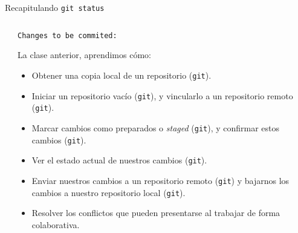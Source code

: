 \begin{frame}[t]{Recapitulando}
    \pause
    \texttt{git status}
    \vspace{.4em}

    \begin{columns}[t]
        \begin{column}{0.05\textwidth}

        \end{column}
        \begin{column}{0.90\textwidth}
            \pause
            \hspace{-.25em}\texttt{Changes to be commited:}

            \pause
            \begin{block}{La clase anterior, aprendimos cómo:}
                \begin{itemize}
                    \pause
                    \item Obtener una copia local de un repositorio (\texttt{git}).
                    \pause\pause
                    \item Iniciar un repositorio vacío (\texttt{git}), \pause\pause
                    y vincularlo a un repositorio remoto (\texttt{git}).
                    \pause\pause
                    \item Marcar cambios como preparados o \textit{staged} (\texttt{git}),
                    \pause\pause y confirmar estos cambios (\texttt{git}).
                    \pause\pause
                    \item Ver el estado actual de nuestros cambios (\texttt{git}).
                    \pause\pause
                    \item Enviar nuestros cambios a un repositorio remoto (\texttt{git}) \pause\pause y
                    bajarnos los cambios a nuestro repositorio local (\texttt{git}).
                    \pause\pause
                    \item Resolver los conflictos que pueden presentarse al trabajar de forma colaborativa.
                \end{itemize}
            \end{block}

        \end{column}
        \begin{column}{0.05\textwidth}

        \end{column}
    \end{columns}

\end{frame}


